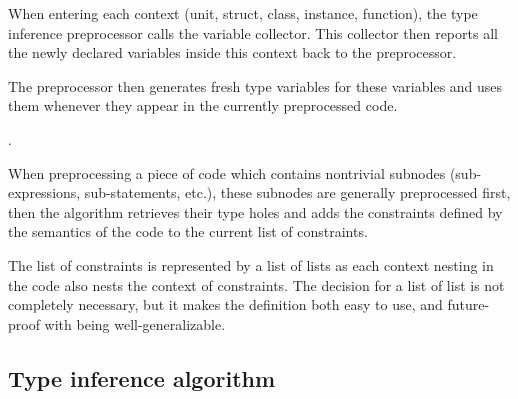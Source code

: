 \begin{defn}
    When entering each context (unit, struct, class, instance, function), the type inference preprocessor calls the variable collector. This collector then reports all the newly declared variables inside this context back to the preprocessor.

    The preprocessor then generates fresh type variables for these variables and uses them whenever they appear in the currently preprocessed code.

    .

    When preprocessing a piece of code which contains nontrivial subnodes (sub-expressions, sub-statements, etc.), these subnodes are generally preprocessed first, then the algorithm retrieves their type holes and adds the constraints defined by the semantics of the code to the current list of constraints.

    The list of constraints is represented by a list of lists as each context nesting in the code also nests the context of constraints. The decision for a list of list is not completely necessary, but it makes the definition both easy to use, and future-proof with being well-generalizable.
\end{defn}

\subsection{Type inference algorithm}

